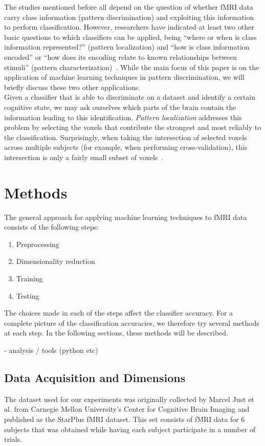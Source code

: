 \documentclass[preprint,journal,11pt]{vgtc}
\begin{document}
The studies mentioned before all depend on the question of whether fMRI data carry class
information (pattern discrimination) and exploiting this information to perform classification. However, researchers have indicated at least two other basic questions to which classifiers can be applied, being ``where or when
is class information represented?'' (pattern localization) and ``how is
class information encoded'' or ``how does its encoding relate to known
relationships between stimuli'' (pattern characterization)~\cite{pereira2009machine}. While the main focus of this paper is on the application of machine learning techniques in pattern discrimination, we will briefly discuss these two other applications.\\

Given a classifier that is able to discriminate on a dataset and identify a certain cognitive state, we may ask ourselves which parts of the brain contain the information leading to this identification. \emph{Pattern localization} addresses this problem by selecting the voxels that contribute the strongest and most reliably to the classification. Surprisingly, when taking the intersection of selected voxels across multiple subjects (for example, when performing cross-validation), this intersection is only a fairly small subset of voxels~\cite{pereira2009machine}. 


\section{Methods}
\label{sec:methods}
The general approach for applying machine learning techniques to fMRI data consists of the following steps:
\begin{enumerate}
  \item Preprocessing
  \item Dimensionality reduction
  \item Training
  \item Testing
\end{enumerate}
The choices made in each of the steps affect the classifier accuracy. For a complete picture of the classification accuracies, we therefore try several methods at each step. In the following sections, these methods will be described.


- analysis / tools (python etc)

\subsection{Data Acquisition and Dimensions}
The dataset used for our experiments was originally collected by Marcel Just et al. from Carnegie Mellon University's Center for Cognitive Brain Imaging and published as the StarPlus fMRI dataset. This set consists of fMRI data for 6 subjects that was obtained while having each subject participate in a number of trials.
\end{document}

